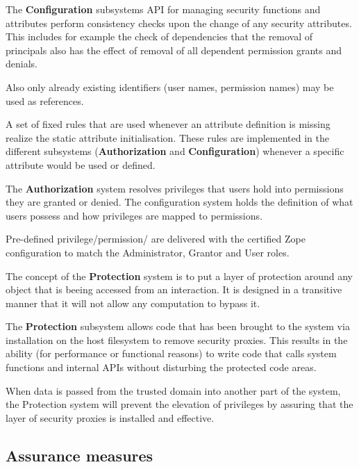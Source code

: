 \documentclass[12pt,english]{scrbook}
\begin{document}
The \textbf{Configuration} subsystems API for managing security functions and
attributes perform consistency checks upon the change of any security
attributes. This includes for example the check of dependencies that the
removal of principals also has the effect of removal of all dependent
permission grants and denials. 

Also only already existing identifiers (user names, permission names) may 
be used as references.


A set of fixed rules that are used whenever an attribute definition is missing
realize the static attribute initialisation. These rules are implemented in the
different subsystems (\textbf{Authorization} and \textbf{Configuration})
whenever a specific attribute would be used or defined.


The \textbf{Authorization} system resolves privileges that users hold into
permissions they are granted or denied. The configuration system holds the
definition of what users possess and how privileges are mapped to permissions.

Pre-defined privilege/permission/ are delivered with the certified Zope
configuration to match the Administrator, Grantor and User roles.


The concept of the \textbf{Protection} system is to put a layer of protection
around any object that is beeing accessed from an interaction. It is designed
in a transitive manner that it will not allow any computation to bypass it.


The \textbf{Protection} subsystem allows code that has been brought to the
system via installation on the host filesystem to remove security proxies. This
results in the ability (for performance or functional reasons) to write code
that calls system functions and internal APIs without disturbing the protected
code areas.

When data is passed from the trusted domain into another part of the system,
the Protection system will prevent the elevation of privileges by assuring that
the layer of security proxies is installed and effective.

\subsection{Assurance measures}
\end{document}
